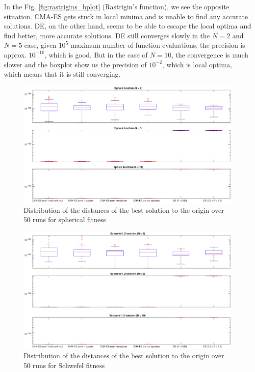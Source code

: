 \documentclass[12pt]{article}
\begin{document}
In the Fig. \ref{fig:rastrigins_bplot} (Rastrigin's function), we see the opposite situation. CMA-ES gets stuck in local minima and is unable to find any accurate solutions. DE, on the other hand, seems to be able to escape the local optima and find better, more accurate solutions. DE still converges slowly in the $N=2$ and $N=5$ case, given $10^5$ maximum number of function evaluations, the precision is approx. $10^{-10}$, which is good. But in the case of $N=10$, the convergence is much slower and the boxplot show us the precision of $10^{-2}$, which is local optima, which means that it is still converging.

\begin{landscape}
\thispagestyle{empty}
    \begin{figure}
        \hspace*{-6cm}
        \includegraphics[width=1.5\linewidth]{pics/sphere_bplot.eps}
        \caption{Distribution of the distances of the best solution to the origin over 50 runs for spherical fitness}
        \label{fig:sphere_bplot}
    \end{figure}
\end{landscape}

\begin{landscape}
\thispagestyle{empty}
    \begin{figure}
        \hspace*{-6cm}
        \includegraphics[width=1.5\linewidth]{pics/schwefel_bplot.eps}
        \caption{Distribution of the distances of the best solution to the origin over 50 runs for Schwefel fitness}
        \label{fig:schwefel_bplot}
    \end{figure}
\end{landscape}
\end{document}
